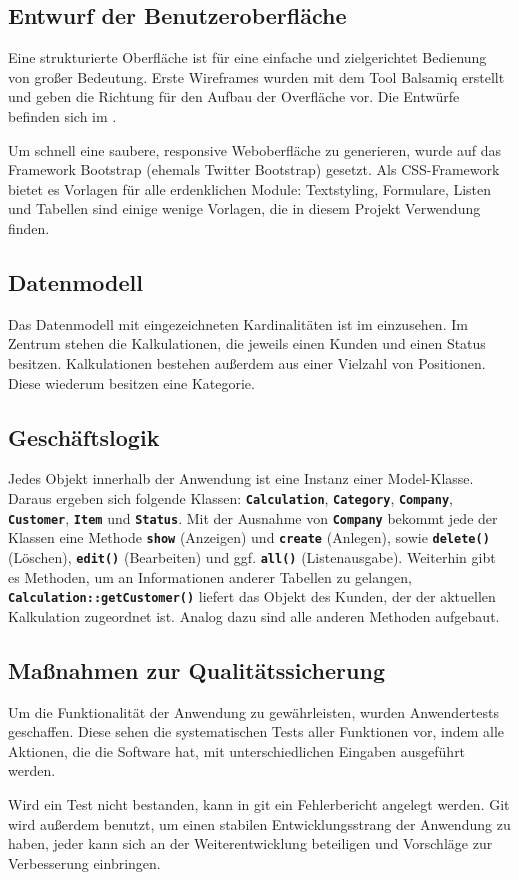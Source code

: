 \subsection{Entwurf der Benutzeroberfläche}
\label{sec:Benutzeroberflaeche}
Eine strukturierte Oberfläche ist für eine einfache und zielgerichtet Bedienung
von großer Bedeutung. Erste Wireframes wurden mit dem Tool
Balsamiq\citet{Balsamiq} erstellt und geben die Richtung für den Aufbau der
Overfläche vor. Die Entwürfe befinden sich im .

Um schnell eine saubere, responsive Weboberfläche zu generieren, wurde auf das
Framework Bootstrap\citet{Bootstrap} (ehemals Twitter Bootstrap) gesetzt. Als
\acs{CSS}-Framework bietet es Vorlagen für alle erdenklichen Module:
Textstyling, Formulare, Listen und Tabellen sind einige wenige Vorlagen, die in
diesem Projekt Verwendung finden.


\subsection{Datenmodell}
\label{sec:Datenmodell}
Das Datenmodell mit eingezeichneten Kardinalitäten ist im
 einzusehen. Im Zentrum stehen die Kalkulationen,
die jeweils einen Kunden und einen Status besitzen. Kalkulationen bestehen
außerdem aus einer Vielzahl von Positionen. Diese wiederum besitzen eine Kategorie.

\subsection{Geschäftslogik}
\label{sec:Geschaeftslogik}
Jedes Objekt innerhalb der Anwendung ist eine Instanz einer Model-Klasse. Daraus
ergeben sich folgende Klassen: \textbf{\texttt{Calculation}},
\textbf{\texttt{Category}}, \textbf{\texttt{Company}},
\textbf{\texttt{Customer}}, \textbf{\texttt{Item}} und \textbf{\texttt{Status}}.
Mit der Ausnahme von \textbf{\texttt{Company}} bekommt jede der Klassen eine
Methode \textbf{\texttt{show}} (Anzeigen) und \textbf{\texttt{create}}
(Anlegen), sowie \textbf{\texttt{delete()}} (Löschen), \textbf{\texttt{edit()}}
(Bearbeiten) und ggf. \textbf{\texttt{all()}} (Listenausgabe).
Weiterhin gibt es Methoden, um an Informationen anderer Tabellen zu gelangen,
\textbf{\texttt{Calculation::\-getCustomer()}} \zB liefert das Objekt des
Kunden, der der aktuellen Kalkulation zugeordnet ist. Analog dazu sind alle
anderen Methoden aufgebaut.

\subsection{Maßnahmen zur Qualitätssicherung}
\label{sec:Qualitaetssicherung}
Um die Funktionalität der Anwendung zu gewährleisten, wurden Anwendertests
geschaffen. Diese sehen die systematischen Tests aller Funktionen vor, indem
alle Aktionen, die die Software hat, mit unterschiedlichen Eingaben ausgeführt
werden.

Wird ein Test nicht bestanden, kann in git ein Fehlerbericht angelegt werden.
Git wird außerdem benutzt, um einen stabilen Entwicklungsstrang der Anwendung zu
haben, jeder kann sich an der Weiterentwicklung beteiligen und Vorschläge zur
Verbesserung einbringen.
